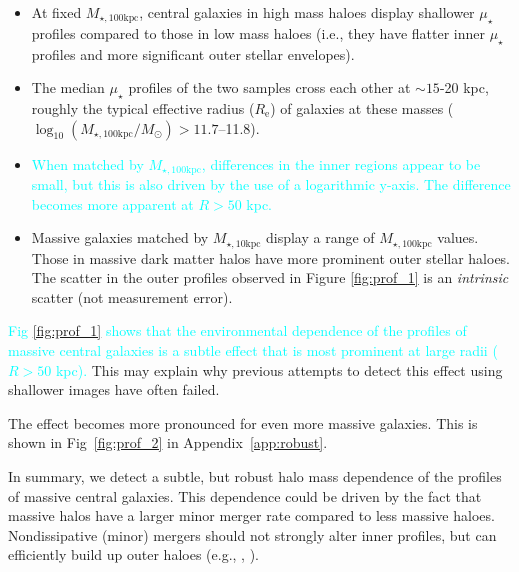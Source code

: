 \documentclass[a4paper,fleqn,usenatbib]{mnras}
\def\minn{{$M_{\star,10\mathrm{kpc}}$}}
\def\mtot{{$M_{\star,100\mathrm{kpc}}$}}
\def\logmtot{{$\log_{10} (M_{\star,100\mathrm{kpc}}/M_{\odot})$}}
\def\mden{{$\mu_{\star}$}}
\newcommand{\song}[1]{\textcolor{cyan}{#1}}
\begin{document}
    \begin{itemize}
        
        \item At fixed \mtot{}, central galaxies in high mass haloes 
            display shallower \mden{} profiles compared to those in low mass haloes (i.e., they have flatter inner \mden{} profiles and 
            more significant outer stellar envelopes). 
            
            \item  The median \mden{} profiles of the two samples cross 
            each other at ${\sim} 15$-20 kpc, roughly the typical effective radius 
            ($R_{\mathrm{e}}$) of galaxies at these masses (\logmtot{}$>11.7$--11.8).  
                        
            \item \song{
            When matched by \mtot{}, differences in the inner regions appear 
            to be small, but this is also driven by the use of a logarithmic y-axis. The difference becomes more apparent 
            at $R>50$ kpc.  
            }
                                
        \item Massive galaxies matched by \minn{} display a range of  \mtot{} values. Those in massive dark matter halos have more prominent outer stellar haloes. The scatter in the outer profiles observed in Figure \ref{fig:prof_1} is an \textit{intrinsic} scatter (not measurement error).                     
    \end{itemize}

    \song{
    Fig \ref{fig:prof_1} shows that the environmental dependence of the profiles of massive central galaxies is a subtle effect that is most prominent at large radii ($R>50$ kpc).
    } This may explain why previous attempts to detect this effect using 
    shallower images have often failed. 
    
    The effect becomes more pronounced for even more massive galaxies. This is shown in Fig~\ref{fig:prof_2} in Appendix~\ref{app:robust}.
    
    In summary, we detect a subtle, but robust halo mass dependence of 
    the profiles of massive central galaxies. 
    This dependence could be driven by the fact that massive halos have a larger minor 
    merger rate compared to less massive haloes. 
    Nondissipative (minor) mergers should not strongly alter inner 
    profiles, but can efficiently build up outer haloes 
    (e.g., \citealt{Hilz2013}, \citealt{Oogi2013}).
      
\end{document}
